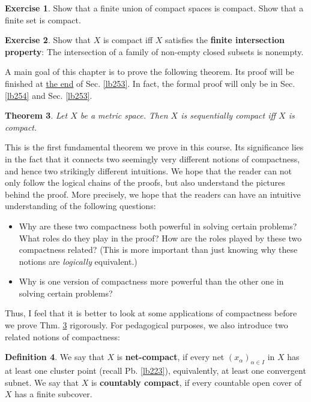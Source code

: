 \documentclass[12pt,b5paper,notitlepage]{article}
\theoremstyle{definition}
\newtheorem{df}{Definition}[section]
\newtheorem{exe}[df]{Exercise}
\theoremstyle{plain}
\newtheorem{thm}[df]{Theorem}
\numberwithin{equation}{section}
\begin{document}
\begin{exe}
Show that a finite union of compact spaces is compact. Show that a finite set is compact.
\end{exe}

\begin{exe}
Show that $X$ is compact iff $X$ satisfies the \textbf{finite intersection property}:  The intersection of a family of non-empty closed subsets is nonempty.
\end{exe}



A main goal of this chapter is to prove the following theorem. Its proof will be finished at \hyperlink{target1}{the end} of Sec. \ref{lb253}. In fact, the formal proof will only be in Sec. \ref{lb254} and Sec. \ref{lb253}. 

\begin{thm}\label{lb222}
Let $X$ be a metric space. Then $X$ is sequentially compact iff $X$ is compact.
\end{thm}
This is the first fundamental theorem we prove in this course. Its significance lies in the fact that it connects two seemingly very different notions of compactness, and hence two strikingly different intuitions. We hope that the reader can not only follow the logical chains of the proofs, but also understand the pictures behind the proof. More precisely, we hope that the readers can have an intuitive understanding of the following questions:
\begin{itemize}
\item Why are these two compactness both powerful in solving certain problems? What roles do they play in the proof? How are the roles played by these two compactness related? (This is more important than just knowing why these notions are \textit{logically} equivalent.)
\item Why is one version of compactness more powerful than the other one in solving certain problems?
\end{itemize}




Thus, I feel that it is better to look at some applications of compactness before we prove Thm. \ref{lb222} rigorously. For pedagogical purposes, we also introduce two related notions of compactness:

\begin{df}
We say that $X$ is \textbf{net-compact},  if every net $(x_\alpha)_{\alpha\in I}$ in $X$ has at least one cluster point (recall Pb. \ref{lb223}), equivalently, at least one convergent subnet. We say that $X$ is \textbf{countably compact},  if every countable open cover of $X$ has a finite subcover.
\end{df}
\end{document}
